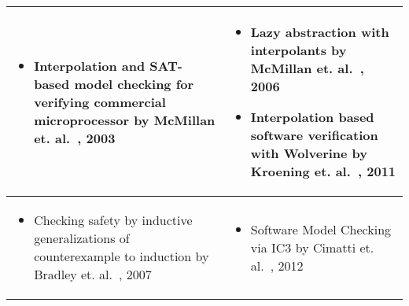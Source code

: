 \begin{table}[]
\begin{tabular}{p{}|p{}}
   \begin{itemize}
     \item Interpolation and SAT-based model checking for verifying commercial
       microprocessor by McMillan et. al.~\cite{cav03}, 2003
   \end{itemize}
   & 
   \begin{itemize}
     \item Lazy abstraction with interpolants by McMillan et. al.~\cite{cav06}, 2006
     \item Interpolation based software verification with Wolverine by Kroening
       et. al.~\cite{cav11}, 2011
   \end{itemize} \\ \hline
   
   \begin{itemize}
     \item Checking safety by inductive generalizations of counterexample to
       induction by Bradley et. al.~\cite{fmcad07}, 2007
   \end{itemize}
   &
   \begin{itemize}
    \item Software Model Checking via IC3 by Cimatti et. al.~\cite{cav12ic3}, 2012
   \end{itemize} \\ \hline
\bottomrule
\end{tabular}
\end{table}
%
